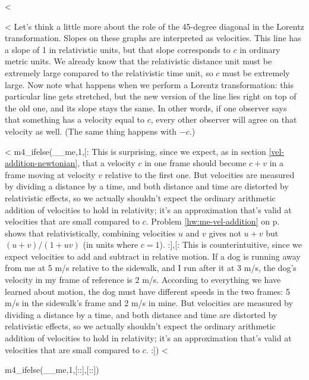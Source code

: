 <%

<%
Let's think a little more about the role of the 45-degree diagonal in the Lorentz transformation.
Slopes on these graphs are interpreted as velocities.
This line has a slope of 1 in relativistic units, but that slope corresponds to $c$ in ordinary metric units.
We already know that the relativistic distance unit must
be extremely large compared to the relativistic time unit, so $c$ must be extremely large.
Now note what happens when we perform a Lorentz transformation: this particular line gets stretched, but the new version
of the line lies right on top of the old one, and its slope stays the
same. In other words, if one observer says  that something has a velocity equal to $c$, every other observer will agree
on that velocity as well. (The same thing happens with $-c$.) 

<%
m4_ifelse(__me,1,[: %
This is surprising, since we expect, as in section \ref{vel-addition-newtonian}, that a velocity $c$
in one frame should become $c+v$ in a frame moving at velocity $v$ relative to the first one.
But velocities are measured by dividing a distance by a time, and
both distance and time are distorted by relativistic effects, so we actually shouldn't expect the ordinary
arithmetic addition of velocities to hold in relativity; it's an approximation that's valid at velocities
that are small compared to $c$. Problem \ref{hw:me-vel-addition} on p.~\pageref{hw:me-vel-addition} shows that
relativistically, combining velocities $u$ and $v$ gives not $u+v$ but $(u+v)/(1+uv)$ (in units where $c=1$).\label{me-vel-addition-main-text}
:],[: %
This is counterintuitive, since we expect velocities to
add and subtract in relative motion. If a dog is running away from me at
5 m/s relative to the sidewalk, and I run after it at 3 m/s,
the dog's velocity in my frame of reference is 2 m/s.
According to everything we have learned about motion, the
dog must have different speeds in the two frames: 5 m/s in
the sidewalk's frame and 2 m/s in mine. But velocities are measured by dividing a distance by a time, and
both distance and time are distorted by relativistic effects, so we actually shouldn't expect the ordinary
arithmetic addition of velocities to hold in relativity; it's an approximation that's valid at velocities
that are small compared to $c$.
:])
<%

m4_ifelse(__me,1,[::],[::])

